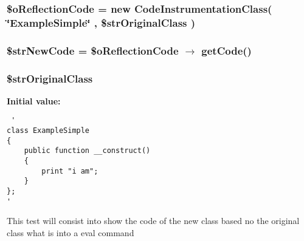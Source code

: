 \hypertarget{test2_8php_dff853bfc3335950f89bfb9e1a779c7e}{
\subsubsection[{\$oReflectionCode}]{\setlength{\rightskip}{0pt plus 5cm}\$oReflectionCode = new CodeInstrumentationClass( \char`\"{}ExampleSimple\char`\"{} , \$strOriginalClass )}}
\label{test2_8php_dff853bfc3335950f89bfb9e1a779c7e}


\hypertarget{test2_8php_882f0b62de6f379d0e0cf88ef6658601}{
\subsubsection[{\$strNewCode}]{\setlength{\rightskip}{0pt plus 5cm}\$strNewCode = \$oReflectionCode $\rightarrow$ getCode()}}
\label{test2_8php_882f0b62de6f379d0e0cf88ef6658601}


\hypertarget{test2_8php_1ac33ebb6e938d93add7631fafed358a}{
\subsubsection[{\$strOriginalClass}]{\setlength{\rightskip}{0pt plus 5cm}\$strOriginalClass}}
\label{test2_8php_1ac33ebb6e938d93add7631fafed358a}


\textbf{Initial value:}

\begin{Code}\begin{verbatim} '
class ExampleSimple
{
    public function __construct()
    {
        print "i am";
    }
};
'
\end{verbatim}
\end{Code}
This test will consist into show the code of the new class based no the original class what is into a eval command 